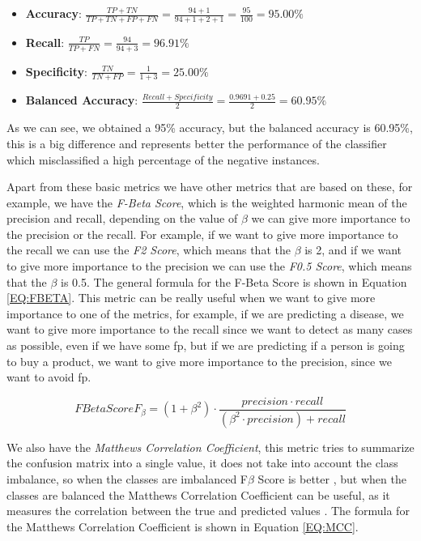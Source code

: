 \begin{itemize}
    \item \textbf{Accuracy}: $ \frac{TP + TN}{TP + TN + FP + FN} = \frac{94 + 1}{94+1+2+1} = \frac{95}{100} = 95.00\%$
    \item \textbf{Recall}: $\frac{TP}{TP + FN}=\frac{94}{94+3} = 96.91\%$
    \item \textbf{Specificity}: $\frac{TN}{TN + FP}=\frac{1}{1+3} = 25.00\%$
    \item \textbf{Balanced Accuracy}: $\frac{Recall + Specificity}{2}=\frac{0.9691 + 0.25}{2} = 60.95\%$
\end{itemize}

As we can see, we obtained a 95\% accuracy, but the balanced accuracy is 60.95\%, this is a big difference and represents better the performance of the classifier which misclassified a high percentage of the negative instances.

Apart from these basic metrics we have other metrics that are based on these, for example, we have the \textit{F-Beta Score}, which is the weighted harmonic mean of the precision and recall, depending on the value of $\beta$ we can give more importance to the precision or the recall. For example, if we want to give more importance to the recall we can use the \textit{F2 Score}, which means that the $\beta$ is 2, and if we want to give more importance to the precision we can use the \textit{F0.5 Score}, which means that the $\beta$ is 0.5. The general formula for the F-Beta Score is shown in Equation \ref{EQ:FBETA}. This metric can be really useful when we want to give more importance to one of the metrics, for example, if we are predicting a disease, we want to give more importance to the recall since we want to detect as many cases as possible, even if we have some \ac{fp}, but if we are predicting if a person is going to buy a product, we want to give more importance to the precision, since we want to avoid \ac{fp}.

\begin{equation}[EQ:FBETA]{F Beta Score}
    \boxed{F_{\beta} = (1+\beta^2)\cdot\frac{precision \cdot recall}{(\beta^2\cdot precision)+recall}}
\end{equation}

We also have the \textit{Matthews Correlation Coefficient}, this metric tries to summarize the confusion matrix into a single value, it 
does not take into account the class imbalance, so when the classes are imbalanced F$\beta$ Score is better \cite{sisters_matthews_2020}, but when the classes are balanced the Matthews Correlation Coefficient can be useful, as it measures the correlation between the true and predicted values \cite{shmueli_matthews_2020}. The formula for the Matthews Correlation Coefficient is shown in Equation \ref{EQ:MCC}.

